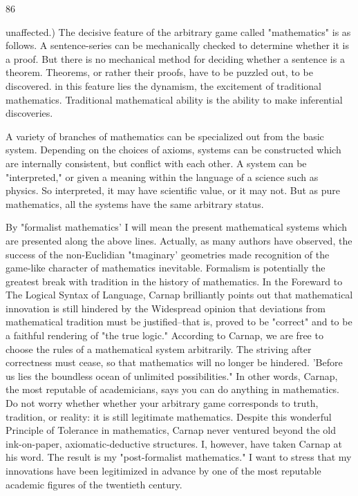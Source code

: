 \documentclass[10pt,twoside]{memoir}
\begin{document}
\begin{enumerate}
{{{{{{{{{{{{{{{{86 


unaffected.) The decisive feature of the arbitrary game called "mathematics" 
is as follows. A sentence-series can be mechanically checked to determine 
whether it is a proof. But there is no mechanical method for deciding 
whether a sentence is a theorem. Theorems, or rather their proofs, have to be 
puzzled out, to be discovered. in this feature lies the dynamism, the 
excitement of traditional mathematics. Traditional mathematical ability is 
the ability to make inferential discoveries. 


A variety of branches of mathematics can be specialized out from the 
basic system. Depending on the choices of axioms, systems can be 
constructed which are internally consistent, but conflict with each other. A 
system can be "interpreted," or given a meaning within the language of a 
science such as physics. So interpreted, it may have scientific value, or it may 
not. But as pure mathematics, all the systems have the same arbitrary status. 

By "formalist mathematics' I will mean the present mathematical 
systems which are presented along the above lines. Actually, as many authors 
have observed, the success of the non-Euclidian "tmaginary' geometries 
made recognition of the game-like character of mathematics inevitable. 
Formalism is potentially the greatest break with tradition in the history of 
mathematics. In the Foreward to The Logical Syntax of Language, Carnap 
brilliantly points out that mathematical innovation is still hindered by the 
Widespread opinion that deviations from mathematical tradition must be 
justified--that is, proved to be "correct" and to be a faithful rendering of 
"the true logic." According to Carnap, we are free to choose the rules of a 
mathematical system arbitrarily. The striving after correctness must cease, so 
that mathematics will no longer be hindered. 'Before us lies the boundless 
ocean of unlimited possibilities." In other words, Carnap, the most reputable 
of academicians, says you can do anything in mathematics. Do not worry 
whether whether your arbitrary game corresponds to truth, tradition, or 
reality: it is still legitimate mathematics. Despite this wonderful Principle of 
Tolerance in mathematics, Carnap never ventured beyond the old 
ink-on-paper, axiomatic-deductive structures. I, however, have taken Carnap 
at his word. The result is my "post-formalist mathematics." I want to stress 
that my innovations have been legitimized in advance by one of the most 
reputable academic figures of the twentieth century. 

}}}}}}}}}}}}}}}}
\end{enumerate}
\end{document}
